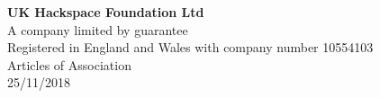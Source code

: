 

\begin{titlepage}
\begin{center}
{\bf \LARGE UK Hackspace Foundation Ltd}\\[36pt]

A company limited by guarantee\\
Registered in England and Wales with company number 10554103\\[36pt]

{\Large Articles of Association}\\[36pt]

25/11/2018
\vfill

\end{center}
\end{titlepage}
\tableofcontents


